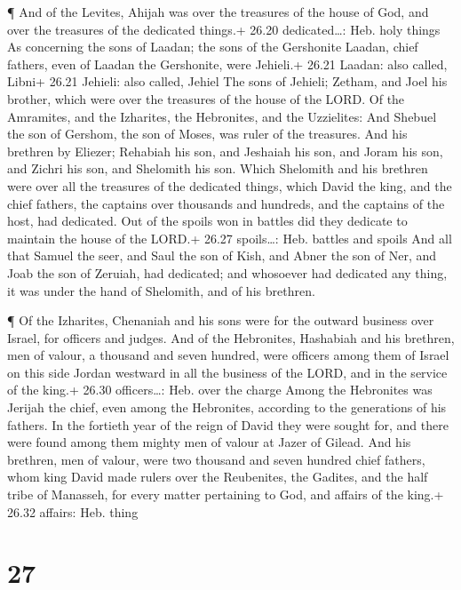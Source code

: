  ¶ And of the Levites, Ahijah was over the treasures of the
house of God, and over the treasures of the dedicated things.+ 26.20
dedicated\ldots: Heb. holy things  As concerning the sons
of Laadan; the sons of the Gershonite Laadan, chief fathers, even of
Laadan the Gershonite, were Jehieli.+ 26.21 Laadan: also called, Libni+
26.21 Jehieli: also called, Jehiel  The sons of Jehieli;
Zetham, and Joel his brother, which were over the treasures of the house
of the LORD.  Of the Amramites, and the Izharites, the
Hebronites, and the Uzzielites:  And Shebuel the son of
Gershom, the son of Moses, was ruler of the treasures.  And
his brethren by Eliezer; Rehabiah his son, and Jeshaiah his son, and
Joram his son, and Zichri his son, and Shelomith his son. 
Which Shelomith and his brethren were over all the treasures of the
dedicated things, which David the king, and the chief fathers, the
captains over thousands and hundreds, and the captains of the host, had
dedicated.  Out of the spoils won in battles did they
dedicate to maintain the house of the LORD.+ 26.27 spoils\ldots: Heb.
battles and spoils  And all that Samuel the seer, and Saul
the son of Kish, and Abner the son of Ner, and Joab the son of Zeruiah,
had dedicated; and whosoever had dedicated any thing, it was under the
hand of Shelomith, and of his brethren.

 ¶ Of the Izharites, Chenaniah and his sons were for the
outward business over Israel, for officers and judges.  And
of the Hebronites, Hashabiah and his brethren, men of valour, a thousand
and seven hundred, were officers among them of Israel on this side
Jordan westward in all the business of the LORD, and in the service of
the king.+ 26.30 officers\ldots: Heb. over the charge 
Among the Hebronites was Jerijah the chief, even among the Hebronites,
according to the generations of his fathers. In the fortieth year of the
reign of David they were sought for, and there were found among them
mighty men of valour at Jazer of Gilead.  And his brethren,
men of valour, were two thousand and seven hundred chief fathers, whom
king David made rulers over the Reubenites, the Gadites, and the half
tribe of Manasseh, for every matter pertaining to God, and affairs of
the king.+ 26.32 affairs: Heb. thing

\hypertarget{section-26}{%
\section{27}\label{section-26}}

